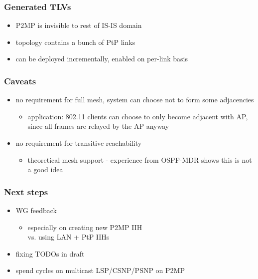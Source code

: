 \documentclass[12pt]{beamer}
\begin{document}
\begin{frame}
  \frametitle{Generated TLVs}

  \begin{itemize}
    \item {\Large P2MP is invisible to rest of IS-IS domain}
    \item topology contains a bunch of PtP links
    \item can be deployed incrementally, enabled on per-link basis
  \end{itemize}
\end{frame}

\begin{frame}
  \frametitle{Caveats}

  \begin{itemize}
    \item no requirement for full mesh, system can choose not to form some adjacencies
    \begin{itemize}
      \item application: 802.11 clients can choose to only become adjacent with AP, since all frames are relayed by the AP anyway
    \end{itemize}
    \item no requirement for transitive reachability
    \begin{itemize}
      \item theoretical mesh support - experience from OSPF-MDR shows this is not a good idea
    \end{itemize}
  \end{itemize}
\end{frame}

\begin{frame}
  \frametitle{Next steps}
  \begin{itemize}
    \item WG feedback
    \begin{itemize}
      \item especially on creating new P2MP IIH \\
            vs. using LAN + PtP IIHs
    \end{itemize}
    \item fixing TODOs in draft
    \item spend cycles on multicast LSP/CSNP/PSNP on P2MP
  \end{itemize}
\end{frame}
\end{document}

